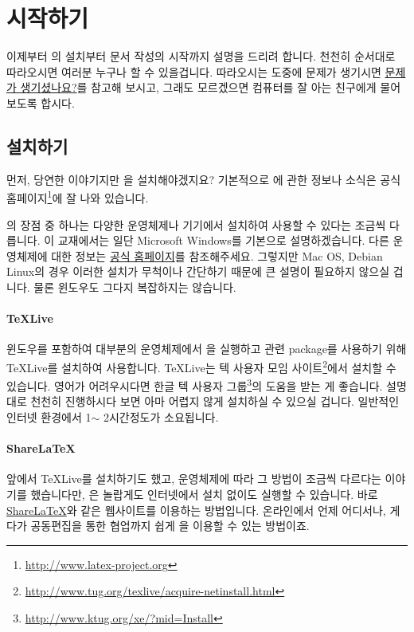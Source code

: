 
\section{\lt{} 시작하기}
\label{sec:beginning}

이제부터 \lt 의 설치부터 문서 작성의 시작까지 설명을 드리려 합니다.
천천히 순서대로 따라오시면 여러분 누구나 할 수 있을겁니다.
따라오시는 도중에 문제가 생기시면 \hyperref[sec2:problem]{문제가 생기셨나요?}를 참고해 보시고, 그래도 모르겠으면 컴퓨터를 잘 아는 친구에게 물어보도록 합시다.

\subsection{\lt{} 설치하기}
\label{sec:lt-install}
먼저, 당연한 이야기지만 \lt 을 설치해야겠지요? 기본적으로 \lt 에 관한 정보나 소식은 공식 홈페이지\footnote{\url{http://www.latex-project.org}}에 잘 나와 있습니다.

\lt 의 장점 중 하나는 다양한 운영체제나 기기에서 설치하여 사용할 수 있다는 조금씩 다릅니다. 이 교재에서는 일단 Microsoft Windows를 기본으로 설명하겠습니다. 다른 운영체제에 대한 정보는 \href{http://www.latex-project.org}{공식 홈페이지}를 참조해주세요. 그렇지만 Mac OS, Debian Linux의 경우 이러한 설치가 무척이나 간단하기 때문에 큰 설명이 필요하지 않으실 겁니다. 물론 윈도우도 그다지 복잡하지는 않습니다.

\paragraph{\TeX Live}
윈도우를 포함하여 대부분의 운영체제에서 \lt 을 실행하고 관련 package를 사용하기 위해 \TeX Live를 설치하여 사용합니다. \TeX Live는 텍 사용자 모임 사이트\footnote{\url{http://www.tug.org/texlive/acquire-netinstall.html}}에서 설치할 수 있습니다. 영어가 어려우시다면 한글 텍 사용자 그룹\footnote{\url{http://www.ktug.org/xe/?mid=Install}}의 도움을 받는 게 좋습니다. 설명대로 천천히 진행하시다 보면 아마 어렵지 않게 설치하실 수 있으실 겁니다. 일반적인 인터넷 환경에서 1$\sim$ 2시간정도가 소요됩니다.

\paragraph{ShareLaTeX}
앞에서 \TeX Live를 설치하기도 했고, 운영체제에 따라 그 방법이 조금씩 다르다는 이야기를 했습니다만, \lt 은 놀랍게도 인터넷에서 설치 없이도 실행할 수 있습니다. 바로 \href{https://www.sharelatex.com/}{ShareLaTeX}와 같은 웹사이트를 이용하는 방법입니다. 온라인에서 언제 어디서나, 게다가 공동편집을 통한 협업까지 쉽게 \lt 을 이용할 수 있는 방법이죠.

